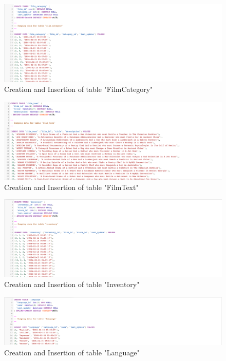 \documentclass{article}
\begin{document}
	\begin{figure}[H]
		\includegraphics[width=\textwidth]{table_filmcategory_cins}
		\caption{Creation and Insertion of table "Film\textunderscore Category"}	
	\end{figure}
	\begin{figure}[H]
		\includegraphics[width=\textwidth]{table_filmtext_cins}
		\caption{Creation and Insertion of table "Film\textunderscore Text"}	
	\end{figure}
	\begin{figure}[H]
		\includegraphics[width=\textwidth]{table_inventory_cins}
		\caption{Creation and Insertion of table "Inventory"}	
	\end{figure}
	\begin{figure}[H]
		\includegraphics[width=\textwidth]{table_language_cins}
		\caption{Creation and Insertion of table "Language"}	
	\end{figure}
\end{document}
